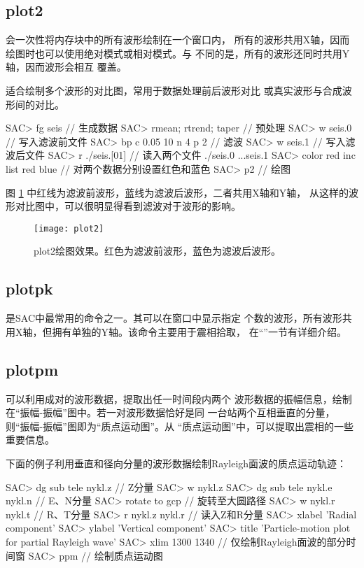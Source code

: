 \subsection{plot2}
 会一次性将内存块中的所有波形绘制在一个窗口内，
所有的波形共用X轴，因而绘图时也可以使用绝对模式或相对模式。与
 不同的是，所有的波形还同时共用Y轴，因而波形会相互
覆盖。

 适合绘制多个波形的对比图，常用于数据处理前后波形对比
或真实波形与合成波形间的对比。
\begin{SACCode}
SAC> fg seis                     // 生成数据
SAC> rmean; rtrend; taper        // 预处理
SAC> w seis.0                    // 写入滤波前文件
SAC> bp c 0.05 10 n 4 p 2        // 滤波
SAC> w seis.1                    // 写入滤波后文件
SAC> r ./seis.[01]               // 读入两个文件
./seis.0 ...seis.1
SAC> color red inc list red blue // 对两个数据分别设置红色和蓝色
SAC> p2                          // 绘图
\end{SACCode}
图 \ref{fig:plot2} 中红线为滤波前波形，蓝线为滤波后波形，二者共用X轴和Y轴，
从这样的波形对比图中，可以很明显得看到滤波对于波形的影响。

\begin{figure}[H]
\centering
\texttt{[image: plot2]}
\caption[plot2绘图效果]{plot2绘图效果。红色为滤波前波形，蓝色为滤波后波形。}
\label{fig:plot2}
\end{figure}

\subsection{plotpk}
 是SAC中最常用的命令之一。其可以在窗口中显示指定
个数的波形，所有波形共用X轴，但拥有单独的Y轴。该命令主要用于震相拾取，
在``''一节有详细介绍。

\subsection{plotpm}
 可以利用成对的波形数据，提取出任一时间段内两个
波形数据的振幅信息，绘制在``振幅-振幅''图中。若一对波形数据恰好是同
一台站两个互相垂直的分量，则``振幅-振幅''图即为``质点运动图''。从
``质点运动图''中，可以提取出震相的一些重要信息。

下面的例子利用垂直和径向分量的波形数据绘制Rayleigh面波的质点运动轨迹：
\begin{SACCode}
SAC> dg sub tele nykl.z             // Z分量
SAC> w nykl.z
SAC> dg sub tele nykl.e nykl.n      // E、N分量
SAC> rotate to gcp                  // 旋转至大圆路径
SAC> w nykl.r nykl.t                // R、T分量
SAC> r nykl.z nykl.r                // 读入Z和R分量
SAC> xlabel 'Radial component'
SAC> ylabel 'Vertical component'
SAC> title 'Particle-motion plot for partial Rayleigh wave'
SAC> xlim 1300 1340                 // 仅绘制Rayleigh面波的部分时间窗
SAC> ppm                            // 绘制质点运动图
\end{SACCode}

